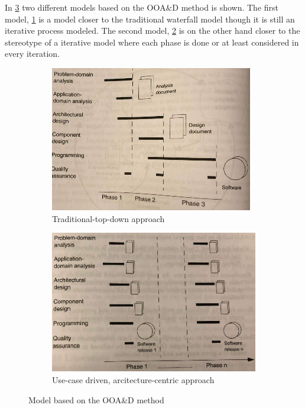 
In \cref{fig:SUModels} two different models based on the OOA\&D method is shown.
The first model, \cref{fig:SUModel1} is a model closer to the traditional waterfall model though it is still an iterative process modeled.
The second model, \cref{fig:SUModel2} is on the other hand closer to the stereotype of a iterative model where each phase is done or at least considered in every iteration.

\begin{figure}[H]
	\centering
	\begin{subfigure}[b]{0.48\textwidth}
		\includegraphics[width=\textwidth]{billeder/SUModel1.png}
		\caption{Traditional-top-down approach \citep[p.~16]{Rod-Aalborg}}
		\label{fig:SUModel1}
	\end{subfigure}
	\quad
	\begin{subfigure}[b]{0.48\textwidth}
		\includegraphics[width=\textwidth]{billeder/SUModel2.png}
		\caption{Use-case driven, arcitecture-centric approach \citep[p.~17]{Rod-Aalborg}}
		\label{fig:SUModel2}
	\end{subfigure}
	\caption{Model based on the OOA\&D method}\label{fig:SUModels}
\end{figure}


